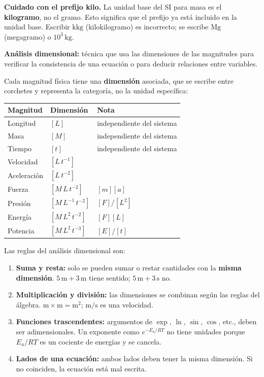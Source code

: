 \begin{notafija}
\textbf{Cuidado con el prefijo kilo.} La unidad base del SI para masa es
el \textbf{kilogramo}, no el gramo. Esto significa que el prefijo ya
está incluido en la unidad base. Escribir $\mathrm{kkg}$ (kilokilogramo)
es incorrecto; se escribe $\mathrm{Mg}$ (megagramo) o
$10^{3}\,\mathrm{kg}$.
\end{notafija}

\textbf{Análisis dimensional:} técnica que usa las dimensiones de las
magnitudes para verificar la consistencia de una ecuación o para
deducir relaciones entre variables.

Cada magnitud física tiene una \textbf{dimensión} asociada, que se
escribe entre corchetes y representa la categoría, no la unidad
específica:

\begin{center}
\renewcommand{\arraystretch}{1.3}
\begin{tabular}{|L{3.5cm}|C{2cm}|L{5cm}|}
\hline
\textbf{Magnitud} & \textbf{Dimensión} & \textbf{Nota} \\
\hline
Longitud & $[L]$ & independiente del sistema \\
\hline
Masa & $[M]$ & independiente del sistema \\
\hline
Tiempo & $[t]$ & independiente del sistema \\
\hline
Velocidad & $[L\,t^{-1}]$ & \\
\hline
Aceleración & $[L\,t^{-2}]$ & \\
\hline
Fuerza & $[M\,L\,t^{-2}]$ & $[m][a]$ \\
\hline
Presión & $[M\,L^{-1}\,t^{-2}]$ & $[F]/[L^2]$ \\
\hline
Energía & $[M\,L^2\,t^{-2}]$ & $[F][L]$ \\
\hline
Potencia & $[M\,L^2\,t^{-3}]$ & $[E]/[t]$ \\
\hline
\end{tabular}
\end{center}

Las reglas del análisis dimensional son:

\begin{enumerate}
    \item \textbf{Suma y resta:} solo se pueden sumar o restar
    cantidades con la \textbf{misma dimensión}. $5\,\mathrm{m} +
    3\,\mathrm{m}$ tiene sentido; $5\,\mathrm{m} + 3\,\mathrm{s}$ no.
    \item \textbf{Multiplicación y división:} las dimensiones se
    combinan según las reglas del álgebra. $\mathrm{m} \times
    \mathrm{m} = \mathrm{m^2}$; $\mathrm{m}/\mathrm{s}$ es una
    velocidad.
    \item \textbf{Funciones trascendentes:} argumentos de $\exp$,
    $\ln$, $\sin$, $\cos$, etc., deben ser adimensionales. Un
    exponente como $e^{-E_a/RT}$ no tiene unidades porque $E_a/RT$
    es un cociente de energías y se cancela.
    \item \textbf{Lados de una ecuación:} ambos lados deben tener la
    misma dimensión. Si no coinciden, la ecuación está mal escrita.
\end{enumerate}

